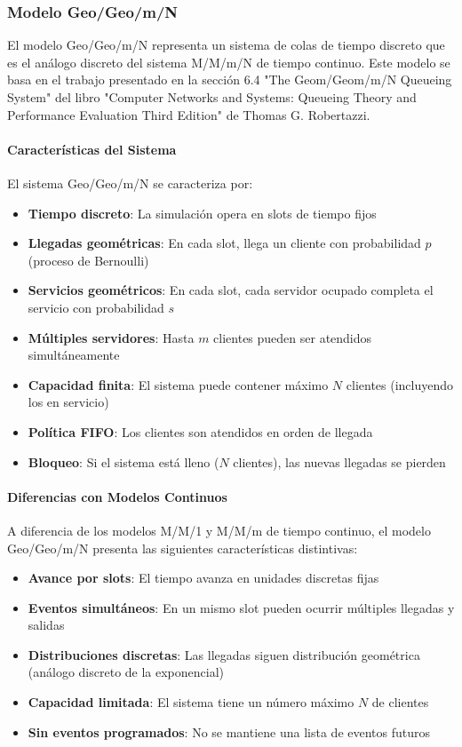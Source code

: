 \documentclass{article}
\begin{document}
\subsubsection{Modelo Geo/Geo/m/N}

El modelo Geo/Geo/m/N representa un sistema de colas de tiempo discreto que es el análogo discreto del sistema M/M/m/N de tiempo continuo. Este modelo se basa en el trabajo presentado en la sección 6.4 "The Geom/Geom/m/N Queueing System" del libro "Computer Networks and Systems: Queueing Theory and Performance Evaluation Third Edition" de Thomas G. Robertazzi.

\paragraph{Características del Sistema}

El sistema Geo/Geo/m/N se caracteriza por:

\begin{itemize}
    \item \textbf{Tiempo discreto}: La simulación opera en slots de tiempo fijos
    \item \textbf{Llegadas geométricas}: En cada slot, llega un cliente con probabilidad $p$ (proceso de Bernoulli)
    \item \textbf{Servicios geométricos}: En cada slot, cada servidor ocupado completa el servicio con probabilidad $s$
    \item \textbf{Múltiples servidores}: Hasta $m$ clientes pueden ser atendidos simultáneamente
    \item \textbf{Capacidad finita}: El sistema puede contener máximo $N$ clientes (incluyendo los en servicio)
    \item \textbf{Política FIFO}: Los clientes son atendidos en orden de llegada
    \item \textbf{Bloqueo}: Si el sistema está lleno ($N$ clientes), las nuevas llegadas se pierden
\end{itemize}

\paragraph{Diferencias con Modelos Continuos}

A diferencia de los modelos M/M/1 y M/M/m de tiempo continuo, el modelo Geo/Geo/m/N presenta las siguientes características distintivas:

\begin{itemize}
    \item \textbf{Avance por slots}: El tiempo avanza en unidades discretas fijas
    \item \textbf{Eventos simultáneos}: En un mismo slot pueden ocurrir múltiples llegadas y salidas
    \item \textbf{Distribuciones discretas}: Las llegadas siguen distribución geométrica (análogo discreto de la exponencial)
    \item \textbf{Capacidad limitada}: El sistema tiene un número máximo $N$ de clientes
    \item \textbf{Sin eventos programados}: No se mantiene una lista de eventos futuros
\end{itemize}
\end{document}
